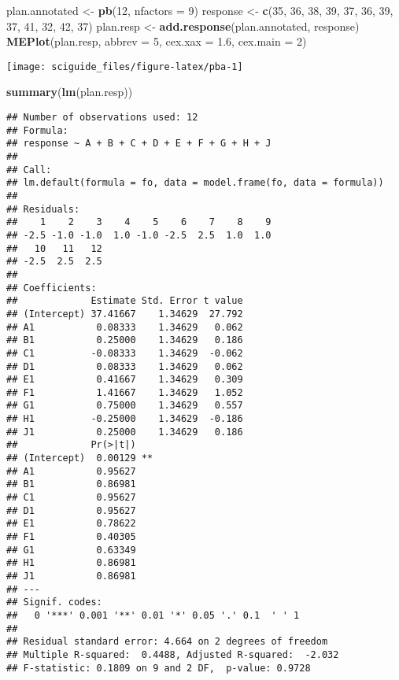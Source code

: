 \documentclass[]{tufte-book}
\newenvironment{Shaded}{}{}
\newcommand{\DataTypeTok}[1]{\textcolor[rgb]{0.56,0.13,0.00}{#1}}
\newcommand{\DecValTok}[1]{\textcolor[rgb]{0.25,0.63,0.44}{#1}}
\newcommand{\FloatTok}[1]{\textcolor[rgb]{0.25,0.63,0.44}{#1}}
\newcommand{\KeywordTok}[1]{\textcolor[rgb]{0.00,0.44,0.13}{\textbf{#1}}}
\newcommand{\NormalTok}[1]{#1}
\newcommand{\StringTok}[1]{\textcolor[rgb]{0.25,0.44,0.63}{#1}}
\begin{document}
\begin{Shaded}
\begin{Highlighting}[]
\NormalTok{plan.annotated <-}\StringTok{ }\KeywordTok{pb}\NormalTok{(}\DecValTok{12}\NormalTok{, }\DataTypeTok{nfactors =} \DecValTok{9}\NormalTok{)}
\NormalTok{response <-}\StringTok{ }\KeywordTok{c}\NormalTok{(}\DecValTok{35}\NormalTok{, }\DecValTok{36}\NormalTok{, }\DecValTok{38}\NormalTok{, }\DecValTok{39}\NormalTok{, }\DecValTok{37}\NormalTok{, }\DecValTok{36}\NormalTok{, }\DecValTok{39}\NormalTok{, }\DecValTok{37}\NormalTok{, }
    \DecValTok{41}\NormalTok{, }\DecValTok{32}\NormalTok{, }\DecValTok{42}\NormalTok{, }\DecValTok{37}\NormalTok{)}
\NormalTok{plan.resp <-}\StringTok{ }\KeywordTok{add.response}\NormalTok{(plan.annotated, response)}
\KeywordTok{MEPlot}\NormalTok{(plan.resp, }\DataTypeTok{abbrev =} \DecValTok{5}\NormalTok{, }\DataTypeTok{cex.xax =} \FloatTok{1.6}\NormalTok{, }\DataTypeTok{cex.main =} \DecValTok{2}\NormalTok{)}
\end{Highlighting}
\end{Shaded}

\texttt{[image: sciguide\_files/figure-latex/pba-1]}

\begin{Shaded}
\begin{Highlighting}[]
\KeywordTok{summary}\NormalTok{(}\KeywordTok{lm}\NormalTok{(plan.resp))}
\end{Highlighting}
\end{Shaded}

\begin{verbatim}
## Number of observations used: 12 
## Formula:
## response ~ A + B + C + D + E + F + G + H + J
## 
## Call:
## lm.default(formula = fo, data = model.frame(fo, data = formula))
## 
## Residuals:
##    1    2    3    4    5    6    7    8    9 
## -2.5 -1.0 -1.0  1.0 -1.0 -2.5  2.5  1.0  1.0 
##   10   11   12 
## -2.5  2.5  2.5 
## 
## Coefficients:
##             Estimate Std. Error t value
## (Intercept) 37.41667    1.34629  27.792
## A1           0.08333    1.34629   0.062
## B1           0.25000    1.34629   0.186
## C1          -0.08333    1.34629  -0.062
## D1           0.08333    1.34629   0.062
## E1           0.41667    1.34629   0.309
## F1           1.41667    1.34629   1.052
## G1           0.75000    1.34629   0.557
## H1          -0.25000    1.34629  -0.186
## J1           0.25000    1.34629   0.186
##             Pr(>|t|)   
## (Intercept)  0.00129 **
## A1           0.95627   
## B1           0.86981   
## C1           0.95627   
## D1           0.95627   
## E1           0.78622   
## F1           0.40305   
## G1           0.63349   
## H1           0.86981   
## J1           0.86981   
## ---
## Signif. codes:  
##   0 '***' 0.001 '**' 0.01 '*' 0.05 '.' 0.1  ' ' 1
## 
## Residual standard error: 4.664 on 2 degrees of freedom
## Multiple R-squared:  0.4488, Adjusted R-squared:  -2.032 
## F-statistic: 0.1809 on 9 and 2 DF,  p-value: 0.9728
\end{verbatim}
\end{document}
